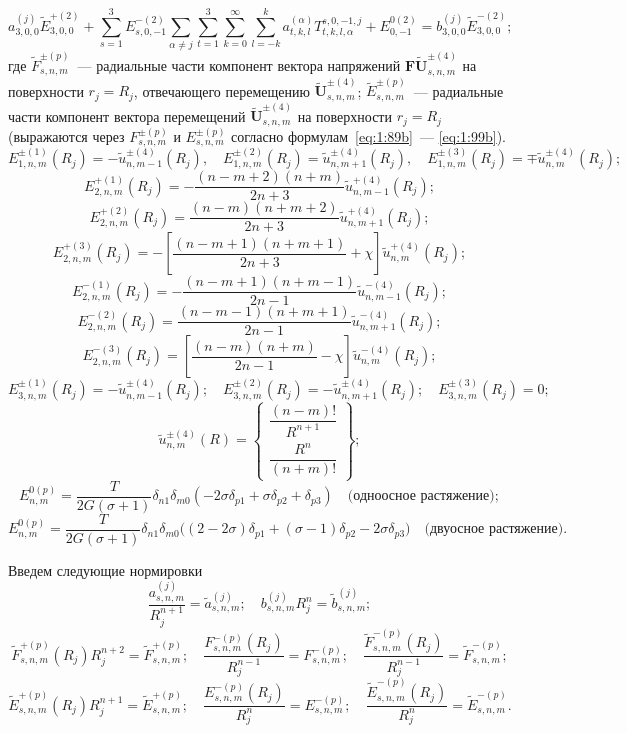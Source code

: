 \begin{equation}
a_{3,0,0}^{(j)}{\tilde E}_{3,0,0}^{+(2)}+\sum_{s=1}^3 E_{s,0,-1}^{-(2)}\sum _{\alpha\neq j} \sum _{t=1}^3 \sum _{k=0}^{\infty}\sum_{l=-k}^k a_{t,k,l}^{(\alpha)} T_{t,k,l,\alpha}^{s,0,-1,j}+E_{0,-1}^{0(2)}=b_{3,0,0}^{(j)}{\tilde E}_{3,0,0}^{-(2)};
\label{eq:13:10b}
\end{equation}
где $\tilde F_{s,n,m}^{\pm (p)}$~--- радиальные части компонент вектора напряжений $\mathbf{F\tilde U}_{s,n,m}^{\pm (4)}$ на поверхности $r_j=R_j$, отвечающего перемещению $\mathbf{\tilde U}_{s,n,m}^{\pm (4)}$; $\tilde E_{s,n,m}^{\pm (p)}$~--- радиальные части компонент вектора перемещений $\mathbf{\tilde U}_{s,n,m}^{\pm (4)}$ на поверхности $r_j=R_j$ (выражаются через $F_{s,n,m}^{\pm (p)}$  и $E_{s,n,m}^{\pm (p)}$ согласно формулам~\eqref{eq:1:89b}~--- \eqref{eq:1:99b}). 
$$
E_{1,n,m}^{ \pm (1)}(R_j) =  - \tilde u_{n,m - 1}^{ \pm (4)}(R_j),\quad
E_{1,n,m}^{ \pm (2)}(R_j) = \tilde u_{n,m + 1}^{ \pm (4)}(R_j),\quad
E_{1,n,m}^{ \pm (3)}(R_j) =  \mp \tilde u_{n,m}^{ \pm (4)}(R_j);
$$
$$
E_{2,n,m}^{ + (1)}(R_j) =  - \frac{{(n - m + 2)(n + m)}}{{2n + 3}}\tilde u_{n,m - 1}^{ + (4)}(R_j);
$$
$$
E_{2,n,m}^{ + (2)}(R_j) = \frac{{(n - m)(n + m + 2)}}{{2n + 3}}\tilde u_{n,m + 1}^{ + (4)}(R_j);
$$
$$
E_{2,n,m}^{ + (3)}(R_j) =  - \left[ {\frac{{(n - m + 1)(n + m + 1)}}{{2n + 3}} + {\chi}} \right]\tilde u_{n,m}^{ + (4)}(R_j);
$$
$$
E_{2,n,m}^{ - (1)}(R_j) =  - \frac{{(n - m + 1)(n + m - 1)}}{{2n - 1}}\tilde u_{n,m - 1}^{ - (4)}(R_j);
$$
$$
E_{2,n,m}^{ - (2)}(R_j) = \frac{{(n - m - 1)(n + m + 1)}}{{2n - 1}}\tilde u_{n,m + 1}^{ - (4)}(R_j);
$$
$$
E_{2,n,m}^{ - (3)}(R_j) = \left[ {\frac{{(n - m)(n + m)}}{{2n - 1}} - {\chi}} \right]\tilde u_{n,m}^{ - (4)}(R_j);
$$
$$
E_{3,n,m}^{ \pm (1)}(R_j) =  - \tilde u_{n,m - 1}^{ \pm (4)}(R_j);\quad
E_{3,n,m}^{ \pm (2)}(R_j) =  - \tilde u_{n,m + 1}^{ \pm (4)}(R_j);\quad
E_{3,n,m}^{ \pm (3)}(R_j) = 0;
$$
$$
\tilde u_{n,m}^{ \pm (4)}(R) = \left\{ \begin{array}{l}
\dfrac{{(n - m)!}}{{{R^{n + 1}}}}\\
\dfrac{{{R^n}}}{{(n + m)!}}
\end{array} \right\};
$$
$$
E_{n,m}^{0(p)}=\frac{T}{2G(\sigma+1)}\delta_{n1}\delta_{m0}(-2\sigma\delta_{p1}+\sigma\delta_{p2}+\delta_{p3})\quad\text{(одноосное растяжение)};
$$
$$
E_{n,m}^{0(p)}=\frac{T}{2G(\sigma+1)}\delta_{n1}\delta_{m0}\big((2-2\sigma)\delta_{p1}+(\sigma-1)\delta_{p2}-
2\sigma\delta_{p3}\big)
\quad\text{(двуосное растяжение)}.
$$

Введем следующие нормировки
$$
\frac{a_{s,n,m}^{(j)}}{R_j^{n+1}}=\tilde a_{s,n,m}^{(j)};\quad b_{s,n,m}^{(j)}R_j^n=\tilde b_{s,n,m}^{(j)};
$$
$$
\tilde F_{s,n,m}^{+(p)}(R_j)R_j^{n+2}=\tilde F_{s,n,m}^{+(p)};\quad\frac{F_{s,n,m}^{-(p)}(R_j)}{R_j^{n-1}}=F_{s,n,m}^{-(p)};\quad\frac{\tilde F_{s,n,m}^{-(p)}(R_j)}{R_j^{n-1}}=\tilde F_{s,n,m}^{-(p)};
$$
$$
\tilde E_{s,n,m}^{+(p)}(R_j)R_j^{n+1}=\tilde E_{s,n,m}^{+(p)};\quad\frac{E_{s,n,m}^{-(p)}(R_j)}{R_j^n}=E_{s,n,m}^{-(p)};\quad\frac{\tilde E_{s,n,m}^{-(p)}(R_j)}{R_j^n}=\tilde E_{s,n,m}^{-(p)}.
$$


